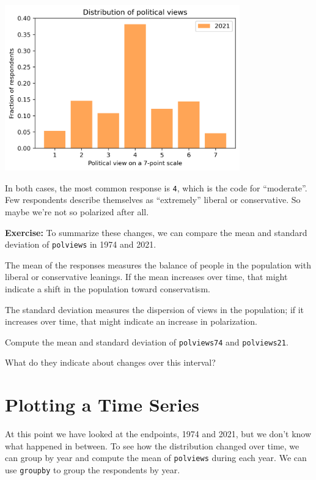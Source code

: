 \begin{center}
\includegraphics[width=4in]{chapters/02_polviews_files/02_polviews_34_0.png}
\end{center}

In both cases, the most common response is \passthrough{\lstinline!4!},
which is the code for ``moderate''. Few respondents describe themselves
as ``extremely'' liberal or conservative. So maybe we're not so
polarized after all.

\textbf{Exercise:} To summarize these changes, we can compare the mean
and standard deviation of \passthrough{\lstinline!polviews!} in 1974 and
2021.

The mean of the responses measures the balance of people in the
population with liberal or conservative leanings. If the mean increases
over time, that might indicate a shift in the population toward
conservatism.

The standard deviation measures the dispersion of views in the
population; if it increases over time, that might indicate an increase
in polarization.

Compute the mean and standard deviation of
\passthrough{\lstinline!polviews74!} and
\passthrough{\lstinline!polviews21!}.

What do they indicate about changes over this interval?

\hypertarget{plotting-a-time-series}{%
\section{Plotting a Time Series}\label{plotting-a-time-series}}

At this point we have looked at the endpoints, 1974 and 2021, but we
don't know what happened in between. To see how the distribution changed
over time, we can group by year and compute the mean of
\passthrough{\lstinline!polviews!} during each year. We can use
\passthrough{\lstinline!groupby!} to group the respondents by year.

